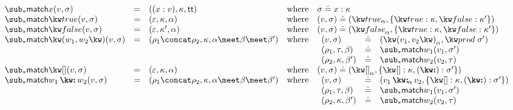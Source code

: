 $\begin{array}{lllll}
   \matchFwdF{x}(v, \sigma)
   &=&
   (\bind{x}{v}, \kappa, \TT)
   &\text{where}&
   \sigma \eq \elimVar{x}{\kappa}
   \\
   \matchFwdF{\matchTrue}(v, \sigma)
   &=&
   (\seqEmpty, \kappa, \alpha)
   &\text{where}&
   (v, \sigma) \eq (\annTrue{\alpha}, \elimBool{\kappa}{\kappa'})
   \\
   \matchFwdF{\matchFalse}(v, \sigma)
   &=&
   (\seqEmpty, \kappa', \alpha)
   &\text{where}&
   (v, \sigma) \eq (\annFalse{\alpha}, \elimBool{\kappa}{\kappa'})
   \\
   \matchFwdF{\matchPair{w_1}{w_2}}(v, \sigma)
   &=&
   (\rho_1 \concat \rho_2, \kappa, \alpha \meet \beta \meet \beta')
   &\text{where}&
   \begin{array}[t]{lll}
      (v, \sigma) &\eq& (\annPair{v_1}{v_2}{\alpha}, \elimProd{\sigma'})
      \\
      (\rho_1, \tau, \beta) &\eq& \matchFwdF{w_1}(v_1,\sigma')
      \\
      (\rho_2, \kappa, \beta') &\eq& \matchFwdF{w_2}(v_2,\tau)
   \end{array}
   \\
   \matchFwdF{\matchNil}(v, \sigma)
   &=&
   (\seqEmpty, \kappa, \alpha)
   &\text{where}&
   (v, \sigma) \eq (\annNil{\alpha}, \elimList{\kappa}{\sigma'})
   \\
   \matchFwdF{\matchCons{w_1}{w_2}}(v, \sigma)
   &=&
   (\rho_1 \concat \rho_2, \kappa, \alpha \meet \beta \meet \beta')
   &\text{where}&
   \begin{array}[t]{lll}
      (v, \sigma) &\eq& (\annCons{v_1}{v_2}{\alpha}, \elimList{\kappa}{\sigma'})
      \\
      (\rho_1, \tau, \beta) &\eq& \matchFwdF{w_1}(v_1,\sigma')
      \\
      (\rho_2, \kappa, \beta') &\eq& \matchFwdF{w_2}(v_2,\tau)
   \end{array}
\end{array}$\\
